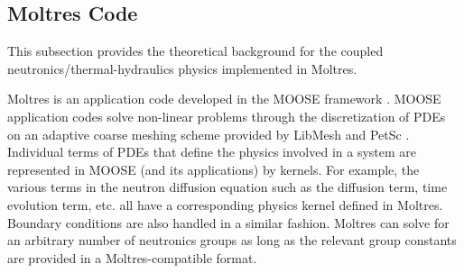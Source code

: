 \documentclass{anstrans}
\begin{document}
\subsection{Moltres Code}

	This subsection provides the theoretical background for the coupled
	neutronics/thermal-hydraulics physics implemented in Moltres.
	
	Moltres is an application code developed in the \gls{MOOSE} framework
	\cite{gaston_moose:_2009}. \gls{MOOSE} application codes solve non-linear
	problems through the discretization of \glspl{PDE} on an adaptive coarse
	meshing scheme provided by LibMesh \cite{kirk_libmesh:_2006} and PetSc
	\cite{satish_balay_petsc_2015}. Individual terms of \glspl{PDE} that define
	the physics involved in a system are represented in \gls{MOOSE} (and its
	applications) by kernels. For example, the various terms in the neutron
	diffusion equation such as the diffusion term, time evolution term, etc.
	all have a corresponding physics kernel defined in Moltres. Boundary
	conditions are also handled in a similar fashion. Moltres can solve for an
	arbitrary number of neutronics groups as long as the relevant group
	constants are provided in a Moltres-compatible format.
\end{document}
